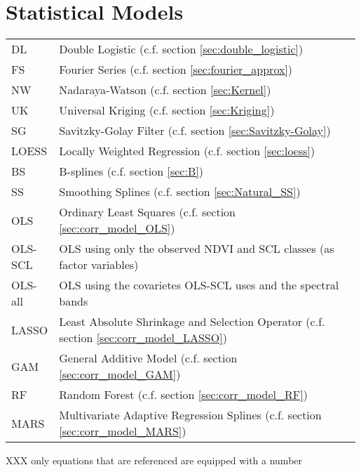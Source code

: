 \section*{Statistical Models}
\begin{longtable}{p{0.12\linewidth} p{0.87\linewidth}}
	DL
		& Double Logistic (c.f. section \ref{sec:double_logistic})\\
	FS
		& Fourier Series (c.f. section \ref{sec:fourier_approx})\\
	NW
		& Nadaraya-Watson (c.f. section \ref{sec:Kernel})\\
	UK
		& Universal Kriging (c.f. section \ref{sec:Kriging})\\
	SG
		& Savitzky-Golay Filter (c.f. section \ref{sec:Savitzky-Golay})\\
	LOESS
		& Locally Weighted Regression (c.f. section \ref{sec:loess})\\
	BS
		& B-splines (c.f. section \ref{sec:B})\\
	SS
		& Smoothing Splines (c.f. section \ref{sec:Natural_SS})\\
	OLS
		& Ordinary Least Squares (c.f. section \ref{sec:corr_model_OLS})\\
	OLS-SCL
		& OLS using only the observed NDVI and SCL classes (as factor variables)\\
	OLS-all
		& OLS using the covarietes OLS-SCL uses and the spectral bands\\
	LASSO
		& Least Absolute Shrinkage and Selection Operator (c.f. section \ref{sec:corr_model_LASSO})\\
	GAM
		& General Additive Model (c.f. section \ref{sec:corr_model_GAM})\\
	RF
		& Random Forest (c.f. section \ref{sec:corr_model_RF})\\
	MARS
		& Multivariate Adaptive Regression Splines (c.f. section \ref{sec:corr_model_MARS})\\
\end{longtable} \renewcommand{\arraystretch}{1}


XXX only equations that are referenced are equipped with a number











